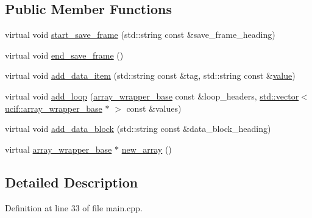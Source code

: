 \subsection*{Public Member Functions}
\begin{DoxyCompactItemize}
\item 
virtual void \hyperlink{structucif_1_1example_1_1my__builder_ae38abd59225516d12747960b1f27a0f4}{start\-\_\-save\-\_\-frame} (std\-::string const \&save\-\_\-frame\-\_\-heading)
\item 
virtual void \hyperlink{structucif_1_1example_1_1my__builder_a983bbffde034f9b617da8d857329c1b5}{end\-\_\-save\-\_\-frame} ()
\item 
virtual void \hyperlink{structucif_1_1example_1_1my__builder_a2ea1c7ff0641b0c2d22b61e798dc20e7}{add\-\_\-data\-\_\-item} (std\-::string const \&tag, std\-::string const \&\hyperlink{read_config_file_8m_afcc7a4b78ecd8fa7e713f8cfa0f51017}{value})
\item 
virtual void \hyperlink{structucif_1_1example_1_1my__builder_a879c47d263894362742c76b67d73c579}{add\-\_\-loop} (\hyperlink{structucif_1_1array__wrapper__base}{array\-\_\-wrapper\-\_\-base} const \&loop\-\_\-headers, \hyperlink{qmb_8m_af54b69a32590de218622e869b06b47b3}{std\-::vector}$<$ \hyperlink{structucif_1_1array__wrapper__base}{ucif\-::array\-\_\-wrapper\-\_\-base} $\ast$ $>$ const \&values)
\item 
virtual void \hyperlink{structucif_1_1example_1_1my__builder_a456c5f66b681af0bb6bdc13fc941f0c5}{add\-\_\-data\-\_\-block} (std\-::string const \&data\-\_\-block\-\_\-heading)
\item 
virtual \hyperlink{structucif_1_1array__wrapper__base}{array\-\_\-wrapper\-\_\-base} $\ast$ \hyperlink{structucif_1_1example_1_1my__builder_a257d75d28779772809b29f1c0adc83d8}{new\-\_\-array} ()
\end{DoxyCompactItemize}


\subsection{Detailed Description}


Definition at line 33 of file main.\-cpp.



